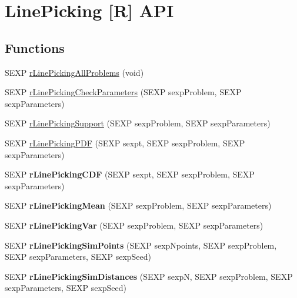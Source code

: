 \hypertarget{group__rapi}{\section{Line\-Picking \mbox{[}R\mbox{]} A\-P\-I}
\label{group__rapi}
}
\subsection*{Functions}
\begin{DoxyCompactItemize}
\item 
S\-E\-X\-P \hyperlink{group__rapi_ga02145a395d24bbe929ffa57688c72ef5}{r\-Line\-Picking\-All\-Problems} (void)
\item 
S\-E\-X\-P \hyperlink{group__rapi_ga9b3ba58aca598b6ee8f7239e87f3076c}{r\-Line\-Picking\-Check\-Parameters} (S\-E\-X\-P sexp\-Problem, S\-E\-X\-P sexp\-Parameters)
\item 
S\-E\-X\-P \hyperlink{group__rapi_ga6b30fc1bdbca2a3cc7f5340f1d8b44d5}{r\-Line\-Picking\-Support} (S\-E\-X\-P sexp\-Problem, S\-E\-X\-P sexp\-Parameters)
\item 
S\-E\-X\-P \hyperlink{group__rapi_gafe4502dd2e61ac946bfe6543fb38dd39}{r\-Line\-Picking\-P\-D\-F} (S\-E\-X\-P sexpt, S\-E\-X\-P sexp\-Problem, S\-E\-X\-P sexp\-Parameters)
\item 
\hypertarget{group__rapi_gac85aaf9284a29359e0d534ac1641b3f2}{S\-E\-X\-P {\bfseries r\-Line\-Picking\-C\-D\-F} (S\-E\-X\-P sexpt, S\-E\-X\-P sexp\-Problem, S\-E\-X\-P sexp\-Parameters)}\label{group__rapi_gac85aaf9284a29359e0d534ac1641b3f2}

\item 
\hypertarget{group__rapi_ga4316d34063551a4121f4cc0b7959b166}{S\-E\-X\-P {\bfseries r\-Line\-Picking\-Mean} (S\-E\-X\-P sexp\-Problem, S\-E\-X\-P sexp\-Parameters)}\label{group__rapi_ga4316d34063551a4121f4cc0b7959b166}

\item 
\hypertarget{group__rapi_gac2d2e36336e7c32427a9e99ccc67d18e}{S\-E\-X\-P {\bfseries r\-Line\-Picking\-Var} (S\-E\-X\-P sexp\-Problem, S\-E\-X\-P sexp\-Parameters)}\label{group__rapi_gac2d2e36336e7c32427a9e99ccc67d18e}

\item 
\hypertarget{group__rapi_gacf32b79fce86f86cedc7843775e163c3}{S\-E\-X\-P {\bfseries r\-Line\-Picking\-Sim\-Points} (S\-E\-X\-P sexp\-Npoints, S\-E\-X\-P sexp\-Problem, S\-E\-X\-P sexp\-Parameters, S\-E\-X\-P sexp\-Seed)}\label{group__rapi_gacf32b79fce86f86cedc7843775e163c3}

\item 
\hypertarget{group__rapi_ga1d8792844b8fb2bfe583d80d7580938d}{S\-E\-X\-P {\bfseries r\-Line\-Picking\-Sim\-Distances} (S\-E\-X\-P sexp\-N, S\-E\-X\-P sexp\-Problem, S\-E\-X\-P sexp\-Parameters, S\-E\-X\-P sexp\-Seed)}\label{group__rapi_ga1d8792844b8fb2bfe583d80d7580938d}

\end{DoxyCompactItemize}


